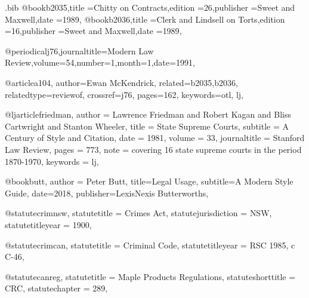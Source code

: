\begin{filecontents*}{\jobname.bib}
@book{b2035,title ={Chitty on Contracts},edition ={26},publisher ={Sweet and Maxwell},date ={1989},}
@book{b2036,title ={Clerk and Lindsell on Torts},edition ={16},publisher ={Sweet and Maxwell},date ={1989},}

@periodical{j76,journaltitle={Modern Law Review},volume={54},number={1},month={1},date={1991},}

@article{a104,
author={Ewan McKendrick},
related={b2035,b2036},
relatedtype={reviewof},
crossref={j76},
pages={162},
keywords={otl, lj},
}




@ljarticle{friedman,
author = {Lawrence Friedman and Robert Kagan and Bliss Cartwright and Stanton Wheeler},
title = {State Supreme Courts},
subtitle = {A Century of Style and Citation},
date = {1981},
volume = {33},
journaltitle = {Stanford Law Review},
pages = {773},
note = {covering 16 state supreme courts in the period 1870-1970},
keywords = {lj},
}



@book{butt,
author = {Peter Butt},
title={Legal Usage},
subtitle={A Modern Style Guide},
date={2018},
publisher={LexisNexis Butterworths},
}


@statute{crimnsw,
statutetitle = {Crimes Act},
statutejurisdiction = {NSW},
statutetitleyear = {1900},%
}


@statute{crimcan,
statutetitle = {Criminal Code},
statutetitleyear = {RSC 1985, c C-46},%
}


@statute{canreg,
statutetitle = {Maple Products Regulations},
statuteshorttitle = {CRC},
statutechapter = {289},
}


\end{filecontents*}
